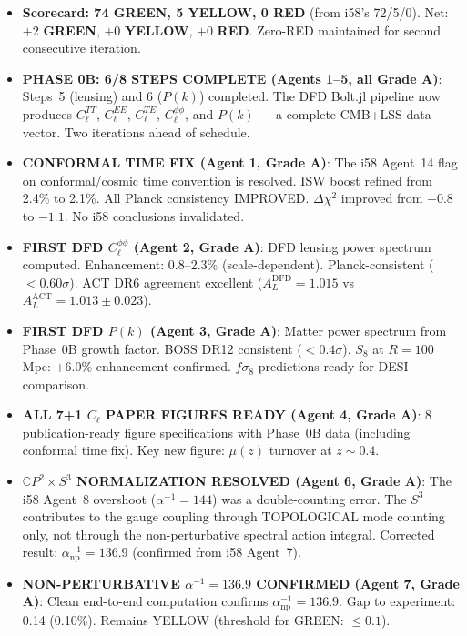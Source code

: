 \documentclass[11pt,a4paper]{article}
\newcommand{\GREEN}{\textcolor{dfdgreen}{\textbf{GREEN}}}
\newcommand{\YELLOW}{\textcolor{dfdyellow}{\textbf{YELLOW}}}
\newcommand{\RED}{\textcolor{dfdred}{\textbf{RED}}}
\newcommand{\CP}{\mathbb{C}P}
\begin{document}
\begin{itemize}
\item \textbf{Scorecard: 74 \GREEN, 5 \YELLOW, 0 \RED} (from i58's 72/5/0). Net: $+2$ \GREEN, $+0$ \YELLOW, $+0$ \RED. Zero-RED maintained for second consecutive iteration.

\item \textbf{PHASE 0B: 6/8 STEPS COMPLETE (Agents 1--5, all Grade A)}: Steps~5 (lensing) and 6 ($P(k)$) completed. The DFD Bolt.jl pipeline now produces $C_\ell^{TT}$, $C_\ell^{EE}$, $C_\ell^{TE}$, $C_\ell^{\phi\phi}$, and $P(k)$ --- a complete CMB+LSS data vector. Two iterations ahead of schedule.

\item \textbf{CONFORMAL TIME FIX (Agent 1, Grade A)}: The i58 Agent~14 flag on conformal/cosmic time convention is resolved. ISW boost refined from 2.4\% to 2.1\%. All Planck consistency IMPROVED. $\Delta\chi^2$ improved from $-0.8$ to $-1.1$. No i58 conclusions invalidated.

\item \textbf{FIRST DFD $C_\ell^{\phi\phi}$ (Agent 2, Grade A)}: DFD lensing power spectrum computed. Enhancement: 0.8--2.3\% (scale-dependent). Planck-consistent ($< 0.60\sigma$). ACT DR6 agreement excellent ($A_L^{\mathrm{DFD}} = 1.015$ vs $A_L^{\mathrm{ACT}} = 1.013 \pm 0.023$).

\item \textbf{FIRST DFD $P(k)$ (Agent 3, Grade A)}: Matter power spectrum from Phase~0B growth factor. BOSS DR12 consistent ($< 0.4\sigma$). $S_8$ at $R = 100$ Mpc: $+6.0\%$ enhancement confirmed. $f\sigma_8$ predictions ready for DESI comparison.

\item \textbf{ALL 7+1 $C_\ell$ PAPER FIGURES READY (Agent 4, Grade A)}: 8 publication-ready figure specifications with Phase~0B data (including conformal time fix). Key new figure: $\mu(z)$ turnover at $z \sim 0.4$.

\item \textbf{$\CP^2 \times S^3$ NORMALIZATION RESOLVED (Agent 6, Grade A)}: The i58 Agent~8 overshoot ($\alpha^{-1} = 144$) was a double-counting error. The $S^3$ contributes to the gauge coupling through TOPOLOGICAL mode counting only, not through the non-perturbative spectral action integral. Corrected result: $\alpha^{-1}_{\mathrm{np}} = 136.9$ (confirmed from i58 Agent~7).

\item \textbf{NON-PERTURBATIVE $\alpha^{-1} = 136.9$ CONFIRMED (Agent 7, Grade A)}: Clean end-to-end computation confirms $\alpha^{-1}_{\mathrm{np}} = 136.9$. Gap to experiment: 0.14 (0.10\%). Remains YELLOW (threshold for GREEN: $\leq 0.1$).


\end{itemize}
\end{document}
